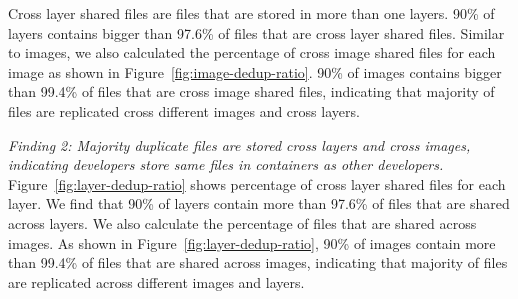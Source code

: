 Cross layer shared files are files that are stored in
more than one layers. 
% 
%
%
90\% of layers contains bigger than 97.6\% of files that are cross layer shared files. Similar to images, we also calculated the percentage of cross image shared files for each image as shown in Figure~\ref{fig:image-dedup-ratio}. 90\% of images contains bigger than 99.4\% of files that are cross image shared files, indicating that majority of files are replicated cross different images and cross layers.

\textit{Finding 2: Majority duplicate files are stored cross layers and cross images, indicating developers store same files in containers as other developers.}
Figure~\ref{fig:layer-dedup-ratio} shows percentage of cross layer
shared files for each layer. We find that 90\% of layers contain more than 97.6\%
of files that are shared across layers. We also calculate the percentage of
files that are shared across images. As shown in
Figure~\ref{fig:layer-dedup-ratio}, 90\% of images contain more than 99.4\% of
files that are shared across images, indicating that majority of files are
replicated across different images and layers.

